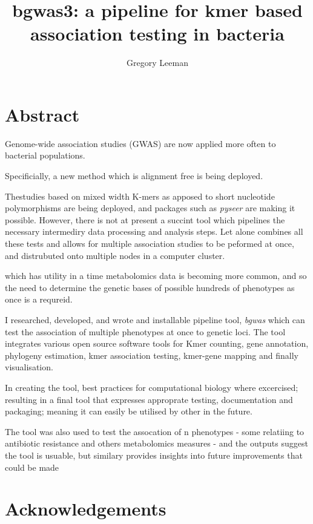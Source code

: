 \documentclass[]{DissertateUSU}
\title{bgwas3: a pipeline for kmer based association testing in bacteria}
\author{Gregory Leeman}
\date{}
\begin{document}
\maketitle

{
\setcounter{tocdepth}{2}
\tableofcontents
}
\hypertarget{abstract}{%
\section{Abstract}\label{abstract}}

Genome-wide association studies (GWAS) are now applied more often to
bacterial populations.

Specificially, a new method which is alignment free is being deployed.

Thestudies based on mixed width K-mers as apposed to short nucleotide
polymorphisms are being deployed, and packages such as \emph{pyseer} are
making it possible. However, there is not at present a succint tool
which pipelines the necessary intermediry data processing and analysis
steps. Let alone combines all these tests and allows for multiple
association studies to be peformed at once, and distrubuted onto
multiple nodes in a computer cluster.

which has utility in a time metabolomics data is becoming more common,
and so the need to determine the genetic bases of possible hundreds of
phenotypes as once is a requreid.

I researched, developed, and wrote and installable pipeline tool,
\emph{bgwas} which can test the association of multiple phenotypes at
once to genetic loci. The tool integrates various open source software
tools for Kmer counting, gene annotation, phylogeny estimation, kmer
association testing, kmer-gene mapping and finally visualisation.

In creating the tool, best practices for computational biology where
excercised; resulting in a final tool that expresses approprate testing,
documentation and packaging; meaning it can easily be utilised by other
in the future.

The tool was also used to test the assocation of n phenotypes - some
relatiing to antibiotic resistance and others metabolomics measures -
and the outputs suggest the tool is usuable, but similary provides
insights into future improvements that could be made

\hypertarget{acknowledgements}{%
\section{Acknowledgements}\label{acknowledgements}}
\end{document}

